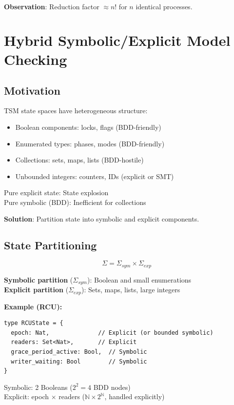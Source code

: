 \documentclass[conference]{IEEEtran}
\begin{document}
\textbf{Observation}: Reduction factor $\approx n!$ for $n$ identical processes.

\section{Hybrid Symbolic/Explicit Model Checking}
\label{sec:hybrid}

\subsection{Motivation}

TSM state spaces have heterogeneous structure:
\begin{itemize}
\item Boolean components: locks, flags (BDD-friendly)
\item Enumerated types: phases, modes (BDD-friendly)
\item Collections: sets, maps, lists (BDD-hostile)
\item Unbounded integers: counters, IDs (explicit or SMT)
\end{itemize}

Pure explicit state: State explosion\\
Pure symbolic (BDD): Inefficient for collections

\textbf{Solution}: Partition state into symbolic and explicit components.

\subsection{State Partitioning}

\begin{equation}
\Sigma = \Sigma_{sym} \times \Sigma_{exp}
\end{equation}

\textbf{Symbolic partition} ($\Sigma_{sym}$): Boolean and small enumerations\\
\textbf{Explicit partition} ($\Sigma_{exp}$): Sets, maps, lists, large integers

\textbf{Example (RCU):}
\begin{lstlisting}
type RCUState = {
  epoch: Nat,              // Explicit (or bounded symbolic)
  readers: Set<Nat>,       // Explicit
  grace_period_active: Bool,  // Symbolic
  writer_waiting: Bool        // Symbolic
}
\end{lstlisting}

Symbolic: 2 Booleans ($2^2 = 4$ BDD nodes)\\
Explicit: epoch $\times$ readers ($\mathbb{N} \times 2^{\mathbb{N}}$, handled explicitly)
\end{document}
